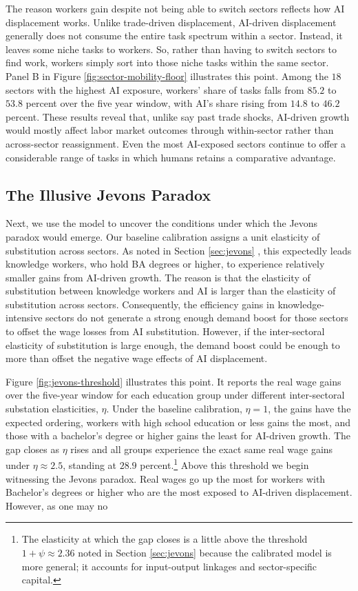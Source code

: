 \documentclass[11pt]{article}
\begin{document}
The reason workers gain despite not being able to switch sectors reflects
how AI displacement works. Unlike trade-driven displacement, AI-driven
displacement generally does not consume the entire task spectrum within
a sector. Instead, it leaves some niche tasks to workers. So, rather
than having to switch sectors to find work, workers simply sort into
those niche tasks within the same sector. Panel B in Figure \ref{fig:sector-mobility-floor}
illustrates this point. Among the $18$ sectors
with the highest AI exposure, workers' share of tasks falls from $85.2$
to $53.8$ percent over the five
year window, with AI's share rising from $14.8$
to $46.2$ percent. These results reveal
that, unlike say past trade shocks, AI-driven growth would mostly
affect labor market outcomes through within-sector rather than across-sector
reassignment. Even the most AI-exposed sectors continue to offer a
considerable range of tasks in which humans retains a comparative
advantage.

\subsection{The Illusive Jevons Paradox}

Next, we use the model to uncover the conditions under which the Jevons
paradox would emerge. Our baseline calibration assigns a unit elasticity
of substitution across sectors. As noted in Section \ref{sec:jevons}
, this expectedly leads knowledge workers, who hold BA degrees or
higher, to experience relatively smaller gains from AI-driven growth.
The reason is that the elasticity of substitution between knowledge
workers and AI is larger than the elasticity of substitution across
sectors. Consequently, the efficiency gains in knowledge-intensive
sectors do not generate a strong enough demand boost for those sectors
to offset the wage losses from AI substitution. However, if the inter-sectoral
elasticity of substitution is large enough, the demand boost could
be enough to more than offset the negative wage effects of AI displacement.

Figure \ref{fig:jevons-threshold} illustrates this point. It reports
the real wage gains over the five-year window for each education group
under different inter-sectoral substation elasticities, $\eta$. Under
the baseline calibration, $\eta=1$, the gains have the expected ordering,
workers with high school education or less gains the most, and those
with a bachelor's degree or higher gains the least for AI-driven growth.
The gap closes as $\eta$ rises and all groups experience the exact
same real wage gains under $\eta\approx2.5$, standing
at $28.9$ percent.\footnote{The elasticity at which the gap closes is a little above the threshold
$1+\psi\approx2.36$ noted in Section \ref{sec:jevons}
because the calibrated model is more general; it accounts for input-output
linkages and sector-specific capital.} Above this threshold we begin witnessing the Jevons paradox. Real
wages go up the most for workers with Bachelor's degrees or higher
who are the most exposed to AI-driven displacement. However, as one
may no
\end{document}

